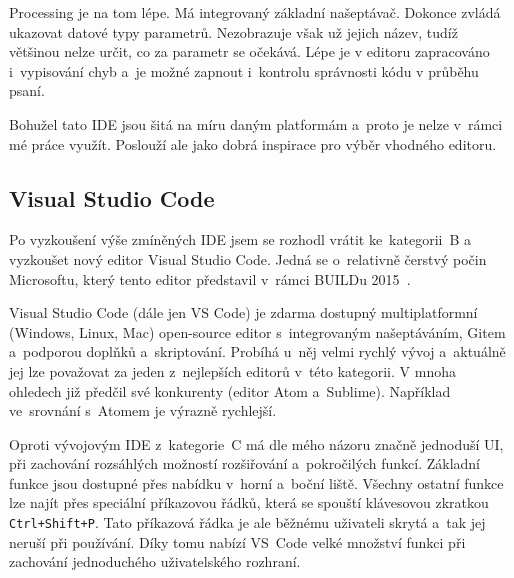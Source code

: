 Processing je na tom lépe. 
Má integrovaný základní našeptávač. 
Dokonce zvládá ukazovat datové typy parametrů.
Nezobrazuje však už jejich název, tudíž většinou nelze určit, co za parametr se očekává.
Lépe je v editoru zapracováno i~vypisování chyb a~je možné zapnout i~kontrolu správnosti kódu v průběhu psaní.

Bohužel tato IDE jsou šitá na míru daným platformám a~proto je nelze v~rámci mé práce využít. 
% 
% 
% 
% 
Poslouží ale jako dobrá inspirace pro výběr vhodného editoru.

\subsection{Visual Studio Code}


Po vyzkoušení výše zmíněných IDE jsem se rozhodl vrátit ke~kategorii~B a vyzkoušet nový editor Visual Studio Code. 
Jedná se o~relativně čerstvý počin Microsoftu, který tento editor představil v~rámci BUILDu 2015~\cite{visual-studio-code_initial-release}.


Visual Studio Code (dále jen VS Code) je zdarma dostupný multiplatformní (Windows, Linux, Mac) open-source editor s~integrovaným našeptáváním, Gitem a~podporou doplňků a~skriptování.
Probíhá u~něj velmi rychlý vývoj a~aktuálně jej lze považovat za jeden z~nejlepších editorů v~této kategorii.
V mnoha ohledech již předčil své konkurenty (editor Atom a~Sublime).
Například ve~srovnání s~Atomem je výrazně rychlejší.

Oproti vývojovým IDE z~kategorie~C má dle mého názoru značně jednoduší UI, při zachování rozsáhlých možností rozšiřování a~pokročilých funkcí. 
Základní funkce jsou dostupné přes nabídku v~horní a~boční liště. 
Všechny ostatní funkce lze najít přes speciální příkazovou řádků, která se spouští klávesovou zkratkou \texttt{Ctrl+Shift+P}. 
Tato příkazová řádka je ale běžnému uživateli skrytá a~tak jej neruší při používání.
Díky tomu nabízí VS~Code velké množství funkci při zachování jednoduchého uživatelského rozhraní.

